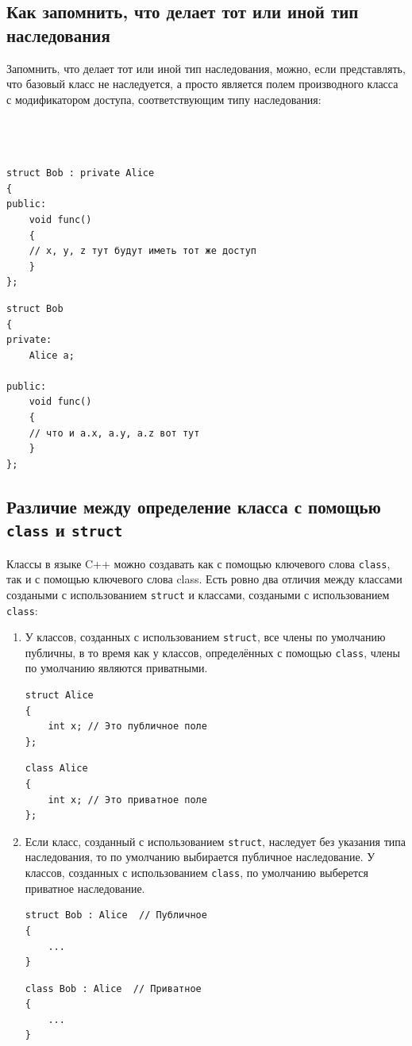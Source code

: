 \documentclass{article}
\begin{document}
\newpage
\subsection*{Как запомнить, что делает тот или иной тип наследования}
Запомнить, что делает тот или иной тип наследования, можно, если представлять, что базовый класс не наследуется, а просто является полем производного класса с модификатором доступа, соответствующим типу наследования:
\begin{multicols}{2}
\begin{lstlisting}



struct Bob : private Alice  
{
public:
	void func()
	{
	// x, y, z тут будут иметь тот же доступ
	}
};
\end{lstlisting}

\begin{lstlisting}
struct Bob
{
private:
	Alice a;

public:
	void func()
	{
	// что и a.x, a.y, a.z вот тут
	}
};
\end{lstlisting}
\end{multicols}
\subsection*{Различие между определение класса с помощью \texttt{class} и \texttt{struct}}
Классы в языке C++ можно создавать как с помощью ключевого слова \texttt{class}, так и с помощью ключевого слова class. Есть ровно два отличия между классами создаными с использованием \texttt{struct} и классами, создаными с использованием \texttt{class}:
\begin{enumerate}
\item У классов, созданных с использованием \texttt{struct}, все члены по умолчанию публичны, в то время как у классов, определённых с помощью \texttt{class}, члены по умолчанию являются приватными.
\begin{multicols}{2}\noindent
\begin{lstlisting}
struct Alice
{
	int x; // Это публичное поле
};
\end{lstlisting}

\begin{lstlisting}
class Alice
{
	int x; // Это приватное поле
};
\end{lstlisting} 
\end{multicols}


\item Если класс, созданный с использованием \texttt{struct}, наследует без указания типа наследования, то по умолчанию выбирается публичное наследование. У классов, созданных с использованием \texttt{class}, по умолчанию выберется приватное наследование.
\begin{multicols}{2}\noindent
\begin{lstlisting}
struct Bob : Alice  // Публичное
{
	...
}
\end{lstlisting}

\begin{lstlisting}
class Bob : Alice  // Приватное
{
	...
}
\end{lstlisting} 
\end{multicols}
\end{enumerate}
\end{document}
